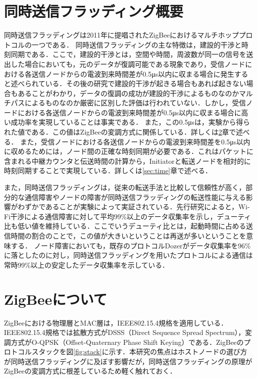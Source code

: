 \section{同時送信フラッディング概要}
同時送信フラッディングは2011年に提唱されたZigBeeにおけるマルチホッププロトコルの一つである．
同時送信フラッディングの主な特徴は，建設的干渉と時刻同期である．ここで，建設的干渉とは，空間や時間，周波数が同一の信号を送出した場合においても，元のデータが復調可能である現象であり，受信ノードにおける各送信ノードからの電波到来時間差が0.5\si{\micro\second}以内に収まる場合に発生すると述べられている\cite{Effi}．その後の研究で建設的干渉が起きる場合もあれば起きない場合もあることがわかり，データの復調の成功が建設的干渉によるものなのかマルチパスによるものなのか厳密に区別した評価は行われていない\cite{revising}．しかし，受信ノードにおける各送信ノードからの電波到来時間差が0.5\si{\micro\second}以内に収まる場合に高い成功率を実現していることは事実である．
また，この0.5\si{\micro\second}は，実験から得られた値である．この値はZigBee\cite{zigbee}の変調方式に関係している．詳しくは\ref{sec:modulation}章で述べる．
また，受信ノードにおける各送信ノードからの電波到来時間差を0.5\si{\micro\second}以内に収めるためには，ノード間の正確な時刻同期が必要である．これはパケットに含まれる中継カウンタと伝送時間の計算から，Initiatorと転送ノードを相対的に時刻同期することで実現している．詳しくは\ref{sec:time}章で述べる．

 また，同時送信フラッディングは，従来の転送手法と比較して信頼性が高く，部分的な通信障害やノードの障害が同時送信フラッディングの転送性能に与える影響がわずかであることが実験によって実証されている．先行研究\cite{lowper}によると，Wi-Fi干渉による通信障害に対して平均99\%以上のデータ収集率を示し，デューティ比も低い値を維持している．ここでいうデューティ比とは，起動時間に占める送信時間の割合のことで，この値が大きいということは再送が多いということを意味する．
 ノード障害においても，既存のプロトコルDozerがデータ収集率を96\%に落としたのに対し，同時送信フラッディングを用いたプロトコルによる通信は常時99\%以上の安定したデータ収集率を示している．

\section{ZigBeeについて}
\label{sec:modulation}
ZigBeeにおける物理層とMAC層は，IEEE802.15.4規格を適用している．IEEE802.15.4規格では拡散方式がDSSS（Direct Sequence Spread Spectrum），変調方式がO-QPSK（Offset-Quaternary Phase Shift Keying）である．ZigBeeのプロトコルスタックを図\ref{fig:stack}に示す．本研究の焦点はホストノードの選び方が同時送信フラッディングに及ぼす影響だが，同時送信フラッディングの原理がZigBeeの変調方式に根差しているため軽く触れておく．


